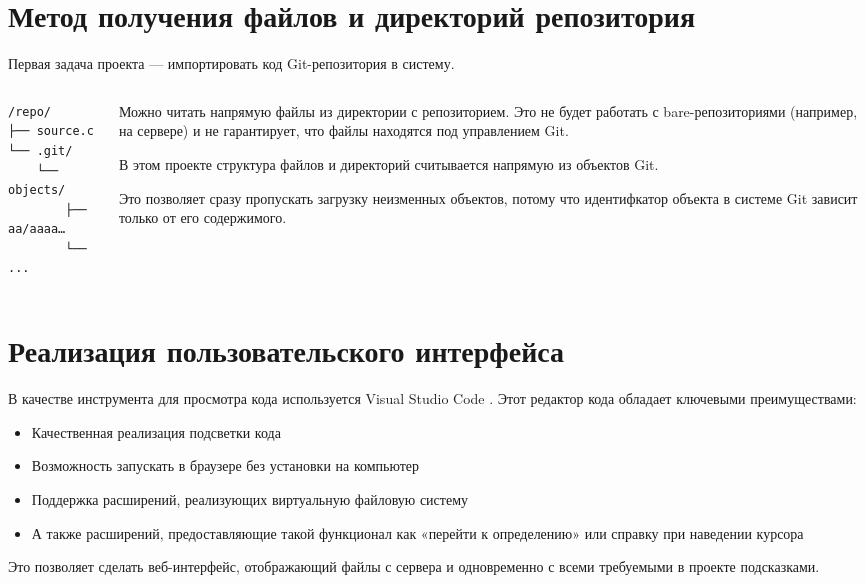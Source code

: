 \documentclass[aspectratio=169,professionalfonts,10pt]{beamer}
\begin{document}
\section{Метод получения файлов и директорий репозитория}
\begin{frame}[fragile=singleslide]{\insertsection}
Первая задача проекта — импортировать код Git-репозитория в систему.\\[2\baselineskip]

\begin{columns}
    \begin{column}{0.3\textwidth}
\begin{verbatim}
/repo/
├── source.c
└── .git/
    └── objects/
        ├── aa/aaaa…
        └── ...
\end{verbatim}
    \end{column}
    \begin{column}{0.7\textwidth}
        Можно читать напрямую файлы из директории с репозиторием. Это не будет работать с bare-репозиториями (например, на сервере) и не гарантирует, что файлы находятся под управлением Git.
        
        В этом проекте структура файлов и директорий считывается напрямую из объектов Git.
        
        Это позволяет сразу пропускать загрузку неизменных объектов, потому что идентифкатор объекта в системе Git зависит только от его содержимого.
    \end{column}
\end{columns}

\end{frame}

\section{Реализация пользовательского интерфейса}
\begin{frame}{\insertsection}

В качестве инструмента для просмотра кода используется Visual Studio Code \cite{vscode}. Этот редактор кода обладает ключевыми преимуществами:
\begin{itemize}
    \item Качественная реализация подсветки кода
    \item Возможность запускать в браузере без установки на компьютер
    \item Поддержка расширений, реализующих виртуальную файловую систему
    \item А также расширений, предоставляющие такой функционал как «перейти к определению» или справку при наведении курсора
\end{itemize}

Это позволяет сделать веб-интерфейс, отображающий файлы с сервера и одновременно с всеми требуемыми в проекте подсказками.

\end{frame}
\end{document}
